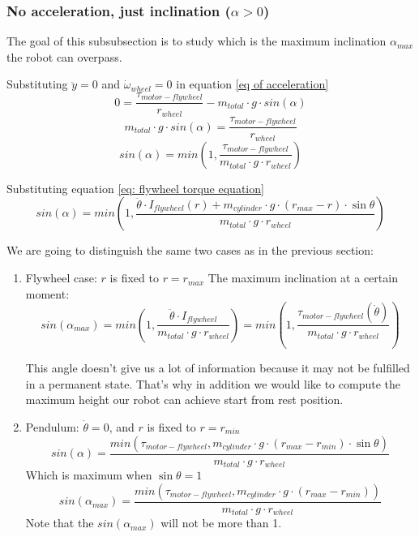 \subsubsection{No acceleration, just inclination ($\alpha > 0$)}
The goal of this subsubsection is to study which is the maximum inclination $\alpha_{max}$ the robot can overpass.

Substituting $\ddot{y}=0$ and $\dot{\omega}_{wheel} = 0$ in equation \ref{eq of acceleration}
\[0 = \frac{\tau_{motor-flywheel}}{r_{wheel}} - m_{total} \cdot  g \cdot  sin(\alpha)\]
\[m_{total} \cdot  g \cdot  sin(\alpha) = \frac{\tau_{motor-flywheel}}{r_{wheel}} \]
\[sin(\alpha) = min(1,\frac{\tau_{motor-flywheel}}{m_{total} \cdot  g \cdot  r_{wheel}}) \]

Substituting equation \ref{eq: flywheel torque equation}
\[sin(\alpha) = min(1,\frac{\ddot{\theta}\cdot I_{flywheel}(r) + m_{cylinder} \cdot  g \cdot  (r_{max} - r) \cdot  \sin{\theta}}{m_{total} \cdot  g \cdot  r_{wheel}}) \]


We are going to distinguish the same two cases as in the previous section:
\begin{enumerate}
    \item Flywheel case: $r$ is fixed to $r = r_{max}$
    The maximum inclination at a certain moment:
    \begin{equation}\label{Maximum angle using flywheel system}
        \boxed{sin(\alpha_{max}) = min(1,\frac{\ddot{\theta}\cdot I_{flywheel}}{m_{total} \cdot  g \cdot  r_{wheel}}) = min(1,\frac{\tau_{motor-flywheel}(\dot{\theta})}{m_{total} \cdot  g \cdot  r_{wheel}})}
    \end{equation}


    This angle doesn't give us a lot of information because it may not be fulfilled in a 
    permanent state. That's why in addition we would like to compute the maximum height
    our robot can achieve start from rest position.
    \item Pendulum: $\dot{\theta} = 0$, and $r$ is fixed to $r = r_{min}$
    \[sin(\alpha) = \frac{min(\tau_{motor-flywheel},m_{cylinder} \cdot  g \cdot  (r_{max} - r_{min}) \cdot  \sin{\theta})}{m_{total} \cdot  g \cdot  r_{wheel}} \]
    Which is maximum when $\sin{\theta} = 1$
    \begin{equation}\label{Maximum angle using pendulum system}
        \boxed{sin(\alpha_{max}) = \frac{min(\tau_{motor-flywheel},m_{cylinder} \cdot  g \cdot  (r_{max} - r_{min}))}{m_{total} \cdot  g \cdot  r_{wheel}}}
    \end{equation}
    Note that the $sin(\alpha_{max})$ will not be more than 1.
\end{enumerate}


